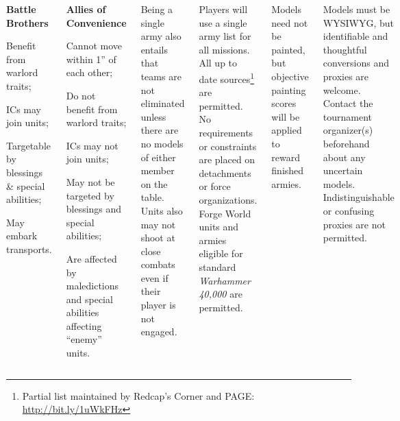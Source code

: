 \documentclass{40k}
\begin{document}
\begin{columns}
\begin{squishitemize}
\item {\bf Battle Brothers}
  \begin{squishitemize}
  \item Benefit from warlord traits;
  \item ICs may join units;
  \item Targetable by blessings \& special abilities;
  \item May embark transports.
  \end{squishitemize}
\end{squishitemize}

\pagebreak
\begin{squishitemize}
\item {\bf Allies of Convenience}
  \begin{squishitemize}
  \item Cannot move within 1'' of each other;
  \item Do not benefit from warlord traits;
  \item ICs may not join units;
  \item May not be targeted by blessings and special abilities;
  \item Are affected by maledictions and special abilities affecting
    ``enemy'' units.
  \end{squishitemize}
\end{squishitemize}

Being a single army also entails that teams are not eliminated unless
there are no models of either member on the table.  Units also may not
shoot at close combats even if their player is not engaged.



Players will use a single army list for all missions.  All up to date
sources\footnote{Partial list maintained by Redcap's Corner and PAGE:
  \url{http://bit.ly/1uWkFHz}} are permitted.  No requirements or
constraints are placed on detachments or force organizations.  Forge
World units and armies eligible for standard \emph{Warhammer 40,000}
are permitted.

Models need not be painted, but objective painting scores will be
applied to reward finished armies.

Models must be WYSIWYG, but identifiable and thoughtful conversions
and proxies are welcome.  Contact the tournament organizer(s)
beforehand about any uncertain models.  Indistinguishable or confusing
proxies are not permitted.


\end{columns}
\end{document}
